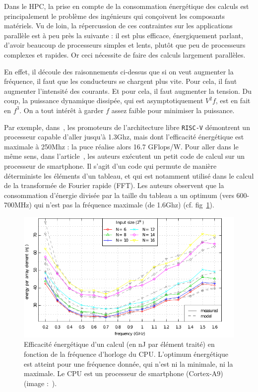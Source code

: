 Dans le HPC, la prise en compte de la consommation énergétique des calculs est
principalement le problème des ingénieurs qui conçoivent les composants
matériels. Vu de loin, la répercussion de ces contraintes sur les applications
parallèle est à peu près la suivante : il est plus efficace, énergiquement
parlant, d'avoir beaucoup de processeurs simples et lents, plutôt que peu de processeurs
complexes et rapides. Or ceci nécessite de faire des calculs largement parallèles.

En effet, il découle des raisonnements ci-dessus que si on veut augmenter la
fréquence, il faut que les conducteurs se chargent plus vite. Pour cela, il faut
augmenter l'intensité des courants. Et pour cela, il faut augmenter la
tension. Du coup, la puissance dynamique dissipée, qui est asymptotiquement
$V^2f$, est en fait en $f^3$. On a tout intérêt à garder $f$ assez faible pour
minimiser la puissance.

Par exemple, dans~\cite{LeeWACSSA14}, les promoteurs de l'architecture libre
\texttt{RISC-V} démontrent un processeur capable d'aller jusqu'à 1.3Ghz, mais
dont l'efficacité énergétique est maximale à 250Mhz : la puce réalise alors 16.7
GFlops/W. Pour aller dans le même sens, dans l'article~\cite{VogeleerMJC13}, les
auteurs exécutent un petit code de calcul sur un processeur de smartphone. Il
s'agit d'un code qui permute de manière déterministe les éléments d'un tableau,
et qui est notamment utilisé dans le calcul de la transformée de Fourier rapide
(FFT). Les auteurs observent que la consommation d'énergie divisée par la taille
du tableau a un optimum (vers 600-700MHz) qui n'est pas la fréquence maximale
(de 1.6Ghz) (cf. fig~\ref{fig:freq_scaling}).

\begin{figure}
  \includegraphics[width=\textwidth]{cpu_freq_scaling.pdf}
  \caption{Efficacité énergétique d'un calcul (en nJ par élément traité) en
    fonction de la fréquence d'horloge du CPU. L'optimum énergétique est atteint
    pour une fréquence donnée, qui n'est ni la minimale, ni la maximale. Le CPU
    est un processeur de smartphone (Cortex-A9) (image
    :~\cite{VogeleerMJC13}). \label{fig:freq_scaling}}
\end{figure}

